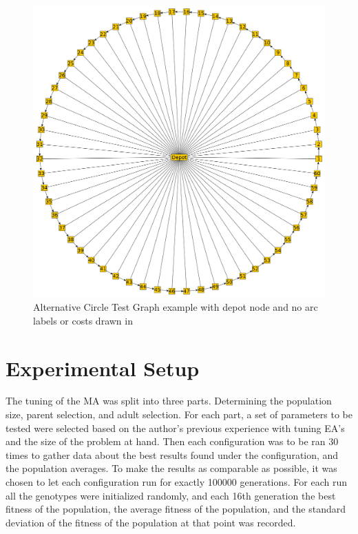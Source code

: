 \begin{figure}[thbp]
	\centerline{\includegraphics[width=\textwidth]{figures/CircleTests/CircleTestIllustrations/Circle_Test_Graph_Central_Depot-No_arc_or_edge_labels_or_costs.pdf}}
	\caption{Alternative Circle Test Graph example with depot node and no arc labels or costs drawn in}
	\label{fig:ctgcdnaoeloc}
\end{figure}



\clearpage

\section{Experimental Setup} %
\label{sec:experimental_setup}
The tuning of the MA was split into three parts. Determining the population size, parent selection, and adult selection. 
For each part, a set of parameters to be tested were selected based on the author's previous experience with tuning EA's and the size of the problem at hand. Then each configuration was to be ran 30 times to gather data about the best results found under the configuration, and the population averages. To make the results as comparable as possible, it was chosen to let each configuration run for exactly 100000 generations. For each run all the genotypes were initialized randomly, and each 16th generation the best fitness of the population, the average fitness of the population, and the standard deviation of the fitness of the population at that point was recorded.

